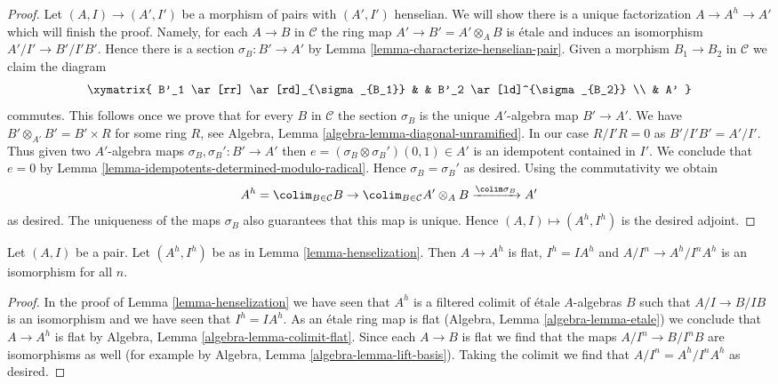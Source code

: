 \begin{proof}
\medskip\noindent
Let $(A, I) \to (A', I')$ be a morphism of pairs with $(A', I')$ henselian.
We will show there is a unique factorization $A \to A^h \to A'$ which will
finish the proof. Namely, for each $A \to B$ in $\mathcal{C}$
the ring map $A' \to B' = A' \otimes_A B$ is \'etale and induces
an isomorphism $A'/I' \to B'/I'B'$. Hence there is a section
$\sigma_B : B' \to A'$ by Lemma \ref{lemma-characterize-henselian-pair}.
Given a morphism $B_1 \to B_2$ in $\mathcal{C}$ we claim the diagram
$$
\xymatrix{
B'_1 \ar[rr] \ar[rd]_{\sigma_{B_1}} & &
B'_2 \ar[ld]^{\sigma_{B_2}} \\
& A'
}
$$
commutes. This follows once we prove that for every $B$ in $\mathcal{C}$
the section $\sigma_B$ is the unique $A'$-algebra map $B' \to A'$.
We have $B' \otimes_{A'} B' = B' \times R$ for some ring $R$, see
Algebra, Lemma \ref{algebra-lemma-diagonal-unramified}. In our case
$R/I'R = 0$ as $B'/I'B' = A'/I'$. Thus given two $A'$-algebra maps
$\sigma_B, \sigma_B' : B' \to A'$ then
$e = (\sigma_B \otimes \sigma_B')(0, 1) \in A'$
is an idempotent contained in $I'$. We conclude that $e = 0$
by Lemma \ref{lemma-idempotents-determined-modulo-radical}.
Hence $\sigma_B = \sigma_B'$ as desired.
Using the commutativity we obtain
$$
A^h = \colim_{B \in \mathcal{C}} B \to
\colim_{B \in \mathcal{C}} A' \otimes_A B \xrightarrow{\colim \sigma_B} A'
$$
as desired. The uniqueness of the maps $\sigma_B$ also guarantees that
this map is unique. Hence $(A, I) \mapsto (A^h, I^h)$ is the desired adjoint.
\end{proof}

\begin{lemma}
\label{lemma-henselization-flat}
Let $(A, I)$ be a pair. Let $(A^h, I^h)$ be as in 
Lemma \ref{lemma-henselization}. Then $A \to A^h$ is flat,
$I^h = IA^h$ and $A/I^n \to A^h/I^nA^h$ is an isomorphism
for all $n$.
\end{lemma}

\begin{proof}
In the proof of Lemma \ref{lemma-henselization} we have seen that
$A^h$ is a filtered colimit of \'etale $A$-algebras $B$ such that
$A/I \to B/IB$ is an isomorphism and we have seen that
$I^h = IA^h$. As an \'etale ring map is flat
(Algebra, Lemma \ref{algebra-lemma-etale}) we conclude that
$A \to A^h$ is flat by Algebra, Lemma \ref{algebra-lemma-colimit-flat}.
Since each $A \to B$ is flat we find that the maps
$A/I^n \to B/I^nB$ are isomorphisms as well (for example by
Algebra, Lemma \ref{algebra-lemma-lift-basis}).
Taking the colimit we find that $A/I^n = A^h/I^nA^h$
as desired.
\end{proof}

